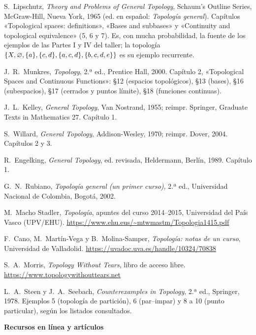 \begin{enumerate}[label={[\arabic*]},leftmargin=2.6em,itemsep=0.3em]\small\sloppy
\item S.~Lipschutz, \emph{Theory and Problems of General Topology}, Schaum's Outline Series, McGraw-Hill, Nueva York,
1965 (ed. en español: \emph{Topología general}). Capítulos «Topological spaces: definitions», «Bases and subbases» y
«Continuity and topological equivalence» (5, 6 y 7). Es, con mucha probabilidad, la fuente de los ejemplos de las
Partes I y IV del taller; la topología $\{X,\varnothing,\{a\},\{c,d\},\{a,c,d\},\{b,c,d,e\}\}$ es su ejemplo recurrente.
\item J.~R.~Munkres, \emph{Topology}, 2.ª ed., Prentice Hall, 2000. Capítulo 2, «Topological Spaces and Continuous
Functions»: §12 (espacios topológicos), §13 (bases), §16 (subespacios), §17 (cerrados y puntos límite), §18
(funciones continuas).
\item J.~L.~Kelley, \emph{General Topology}, Van Nostrand, 1955; reimpr. Springer, Graduate Texts in Mathematics 27.
Capítulo 1.
\item S.~Willard, \emph{General Topology}, Addison-Wesley, 1970; reimpr. Dover, 2004. Capítulos 2 y 3.
\item R.~Engelking, \emph{General Topology}, ed. revisada, Heldermann, Berlín, 1989. Capítulo 1.
\item G.~N.~Rubiano, \emph{Topología general (un primer curso)}, 2.ª ed., Universidad Nacional de Colombia, Bogotá,
2002.
\item M.~Macho Stadler, \emph{Topología}, apuntes del curso 2014--2015, Universidad del País Vasco (UPV/EHU).
\url{https://www.ehu.eus/~mtwmastm/Topologia1415.pdf}
\item F.~Cano, M.~Martín-Vega y B.~Molina-Samper, \emph{Topología: notas de un curso}, Universidad de Valladolid.
\url{https://uvadoc.uva.es/handle/10324/70838}
\item S.~A.~Morris, \emph{Topology Without Tears}, libro de acceso libre. \url{https://www.topologywithouttears.net}
\item L.~A.~Steen y J.~A.~Seebach, \emph{Counterexamples in Topology}, 2.ª ed., Springer, 1978. Ejemplos 5 (topología
de partición), 6 (par--impar) y 8 a 10 (punto particular), según los listados consultados.
\end{enumerate}
\textbf{Recursos en línea y artículos}
